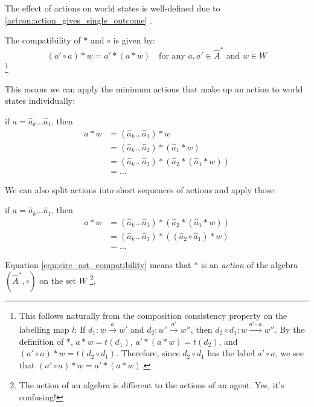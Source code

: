 The effect of actions on world states is well-defined due to \cref{actcon:action_gives_single_outcome} .

The compatibility of $\ast$ and $\circ$ is given by:
\begin{equation}\label{eqn:circ_ast_compatibility}
	(a' \circ a) \ast w = a' \ast (a \ast w) \quad \text{for any $a, a' \in \hat{A}^{\ast}$ and $w \in W$}
\end{equation}
\footnote{
	This follows naturally from the composition consistency property on the labelling map $l$:
	If $d_{1}: w \xrightarrow{a} w'$ and $d_{2}: w' \xrightarrow{a'} w''$, then $d_{2} \circ d_{1}: w \xrightarrow{a' \circ a} w''$.
	By the definition of $\ast$, $a * w = t(d_{1})$, $a' \ast (a \ast w) = t(d_{2})$, and $(a' \circ a) \ast w = t(d_{2} \circ d_{1})$.
	Therefore, since $d_{2} \circ d_{1}$ has the label $a' \circ a$, we see that $(a' \circ a) \ast w = a' \ast (a \ast w)$.
}

This means we can apply the minimum actions that make up an action to world states individually:

if $a = \hat{a}_{k}...\hat{a}_{1}$, then
\begin{align}
	a \ast w & = (\hat{a}_{k} \dots \hat{a}_{1}) \ast w                                       \\
	         & = (\hat{a}_{k} \dots \hat{a}_{2}) \ast (\hat{a}_{1} \ast w)                    \\
	         & = (\hat{a}_{k} \dots \hat{a}_{3}) \ast (\hat{a}_{2} \ast (\hat{a}_{1} \ast w)) \\
	         & = \dots
\end{align}

We can also split actions into short sequences of actions and apply those:

if $a = \hat{a}_{k}...\hat{a}_{1}$, then
\begin{align}
	a \ast w & = (\hat{a}_{k} \dots \hat{a}_{3}) \ast (\hat{a}_{2} \ast (\hat{a}_{1} \ast w))  \\
	         & = (\hat{a}_{k} \dots \hat{a}_{3}) \ast ((\hat{a}_{2} \circ \hat{a}_{1}) \ast w) \\
	         & = \dots
\end{align}

Equation \ref{eqn:circ_ast_compatibility} means that $\ast$ is an \emph{action} of the algebra $(\hat{A}^{\ast}, \circ)$ on the set $W$ \footnote{
	The action of an algebra is different to the actions of an agent.
	Yes, it's confusing!
}.



